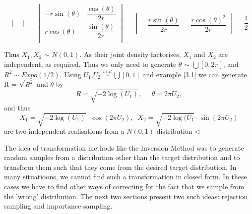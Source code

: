 \documentclass[a4paper,10pt]{article}
\newenvironment{example}[1][Example]{\begin{trivlist}
\item[\hskip \labelsep {\bfseries #1}]}{\end{trivlist}}
\begin{document}
\begin{example}[Box-Muller Method for Sampling from Gaussians]
\begin{displaymath}
\begin{vmatrix}
\end{vmatrix} = \begin{vmatrix}
-r\sin(\theta) & \dfrac{\cos(\theta)}{2r} \\[3pt]
r\cos(\theta) & \dfrac{\sin (\theta)}{2r} \\[3pt]

\end{vmatrix} =  \begin{vmatrix}
-\dfrac{r\sin(\theta)}{2r} & - \dfrac{r\cos(\theta)^{2}}{2r}

\end{vmatrix}
= \frac{1}{2}
\end{displaymath}


Thus $X_1,X_2$ $\sim$ $N(0,1).$ As their joint density factorises, $X_1$ and $X_2$ are independent, as required. 
   Thus we only need to generate $\theta$ $\sim$ $\bigcup[0,2\pi]$, and $R^{2} \sim Expo(1/2)$.
   Using $U_1$,$U_2$ $\stackrel{i.i.d.}{\sim} \bigcup[0,1]$ and example \ref{3.1} we can generate R = $\sqrt{R^{2}}$
   and $\theta$ by 
   \begin{equation*}
    R = \sqrt{-2\log(U_1)},\;\;\;\;\; \theta = 2\pi U_2,
   \end{equation*}
and thus
\begin{equation*}
 X_1 = \sqrt{-2 \log (U_1)}\cdot \cos(2\pi U_2), \;\; X_2 = \sqrt{-2\log(U_1}\cdot \sin(2\pi U_2)
\end{equation*}
are two independent realisations from a $N(0,1)$ distribution  \quad\quad$\triangleleft$              \end{example}

 The idea of transformation methods like the Inversion Method was to generate random samples
 from a distribution other than the target distribution and to transform them such that they come
 from the desired target distribution. In many situatioons, we cannot find such a transformation in closed form.
 In these cases we have to find other ways of correcting for the fact that we sample from the 'wrong' distribution.
 The next two sections present two such ideas: rejection sampling and importance sampling.
\end{document}
